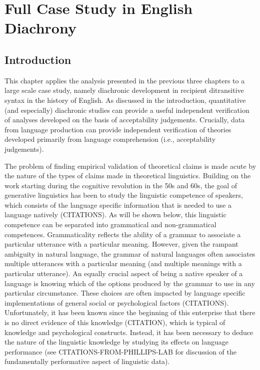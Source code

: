 \chapter{Full Case Study in English Diachrony}\label{ch:diachron}
\section{Introduction}
This chapter applies the analysis presented in the previous three chapters to a large scale case study, namely diachronic development in recipient ditransitive syntax in the history of English. As discussed in the introduction, quantitative (and especially) diachronic studies can provide a useful independent verification of analyses developed on the basis of acceptability judgements. Crucially, data from language production can provide independent verification of theories developed primarily from language comprehension (i.e., acceptability judgements).

The problem of finding empirical validation of theoretical claims is made acute by the nature of the types of claims made in theoretical linguistics. Building on the work starting during the cognitive revolution in the 50s and 60s, the goal of generative linguistics has been to study the linguistic competence of speakers, which consists of the language specific information that is needed to use a language natively (CITATIONS). As will be shown below, this linguistic competence can be separated into grammatical and non-grammatical competences. Grammaticality reflects the ability of a grammar to associate a particular utterance with a particular meaning. However, given the rampant ambiguity in natural language, the grammar of natural languages often associates multiple utterances with a particular meaning (and multiple meanings with a particular utterance). An equally crucial aspect of being a native speaker of a language is knowing which of the options produced by the grammar to use in any particular circumstance. These choices are often impacted by language specific implementations of general social or psychological factors (CITATIONS). Unfortunately, it has been known since the beginning of this enterprise that there is no direct evidence of this knowledge (CITATION), which is typical of knowledge and psychological constructs. Instead, it has been necessary to deduce the nature of the linguistic knowledge by studying its effects on language performance (see CITATIONS-FROM-PHILLIPS-LAB for discussion of the fundamentally performative aspect of linguistic data).

